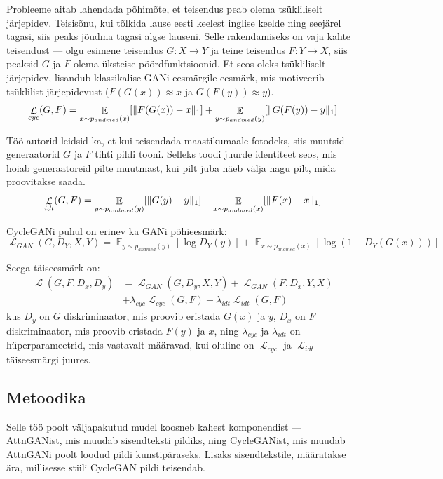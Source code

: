 \documentclass{vilgym}
\DeclareMathOperator{\EX}{\mathbb{E}}
\DeclareMathOperator{\loss}{\mathcal{L}}
\DeclarePairedDelimiter{\norm}{\lVert}{\rVert}
\begin{document}
	Probleeme aitab lahendada põhimõte, et teisendus peab olema tsükliliselt järjepidev. Teisisõnu, kui tõlkida lause eesti keelest inglise keelde ning seejärel tagasi, siis peaks jõudma tagasi algse lauseni. Selle rakendamiseks on vaja kahte teisendust --- olgu esimene teisendus $ G\colon X \rightarrow Y $ ja teine teisendus $ F\colon Y \rightarrow X $, siis peaksid $ G $ ja $ F $ olema üksteise pöördfunktsioonid. Et seos oleks tsükliliselt järjepidev, lisandub klassikalise GANi eesmärgile eesmärk, mis motiveerib tsüklilist järjepidevust ($ F(G(x)) \approx x $ ja $ G(F(y)) \approx y $).
	\begin{equation}
		\loss_{cyc}(G,F) = \EX_{x\sim p_{andmed}(x)}[\norm{F(G(x)) - x}_1] + \EX_{y\sim p_{andmed}(y)}[\norm{G(F(y)) - y}_1]
	\end{equation}

	Töö autorid leidsid ka, et kui teisendada maastikumaale fotodeks, siis muutsid generaatorid $ G $ ja $ F $ tihti pildi tooni. Selleks toodi	juurde identiteet seos, mis hoiab generaatoreid pilte muutmast, kui pilt juba näeb välja nagu pilt, mida proovitakse saada.
	\begin{equation} \label{eq:idt}
		\loss_{idt}(G,F) = \EX_{y\sim p_{andmed}(y)}[\norm{G(y) - y}_1] + \EX_{x\sim p_{andmed}(x)}[\norm{F(x) - x}_1]
	\end{equation}

	CycleGANi puhul on erinev ka GANi põhieesmärk:
	\begin{equation}
		\loss_{GAN}(G,D_Y, X, Y) = \EX_{y\sim p_{andmed}(y)}[\log D_Y(y)] + \EX_{x\sim p_{andmed}(x)}[\log(1-D_Y(G(x)))]
	\end{equation}
	
	Seega täiseesmärk on:
	\begin{equation} \label{eq:cyclegan}
		\begin{aligned}
			\loss(G, F, D_x, D_y) &= \loss_{GAN}(G, D_y, X, Y) + \loss_{GAN}(F, D_x, Y, X) \\
								  &+ \lambda_{cyc} \loss_{cyc}(G, F) + \lambda_{idt} \loss_{idt}(G, F)
		\end{aligned}
	\end{equation}
	kus $ D_y $ on $ G $ diskriminaator, mis proovib eristada $ G(x) $ ja $ y $, $ D_x $ on  $ F $ diskriminaator, mis proovib eristada $ F(y) $ ja $ x $, ning $ \lambda_{cyc} $ ja $ \lambda_{idt} $ on hüperparameetrid, mis vastavalt määravad, kui oluline on $ \loss_{cyc} $ ja $ \loss_{idt} $ täiseesmärgi juures. \parencite{cyclegan}

	\subsection{Metoodika}
	Selle töö poolt väljapakutud mudel koosneb kahest komponendist --- AttnGANist, mis muudab sisendteksti pildiks, ning CycleGANist, mis muudab AttnGANi poolt loodud pildi kunstipäraseks. Lisaks sisendtekstile, määratakse ära, millisesse stiili CycleGAN pildi teisendab.
\end{document}
